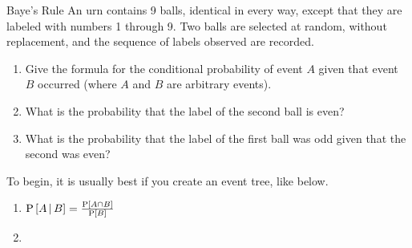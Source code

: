 		\begin{example}{Baye's Rule}
			An urn contains 9 balls, identical in every way, except that they are labeled with numbers 1 through 9.
			Two balls are selected at random, without replacement, and the sequence of labels observed are recorded.
			\begin{enumerate}[label=(\alph*), noitemsep, nolistsep]
				\item Give the formula for the conditional probability of event $A$ given that event $B$ occurred (where $A$ and $B$ are arbitrary events).
				\item What is the probability that the label of the second ball is even?
				\item What is the probability that the label of the first ball was odd given that the second was even?
			\end{enumerate}
		
			\tcblower
			To begin, it is usually best if you create an event tree, like below.
			\newline
			\begin{center}
				
			\end{center}
			\begin{enumerate}[label=(\alph*)]
				\item $\operatorname{\operatorname{P}} \left[ A \operatorname{\vert} B \right] = \frac{\operatorname{\operatorname{P}} \left[ A \cap B \right]}{\operatorname{\operatorname{P}} \left[ B \right]}$
				\item 
			\end{enumerate}
		\end{example}
	
